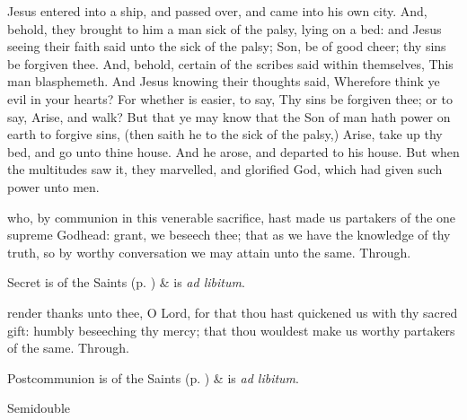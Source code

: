 
 Jesus entered into a ship, and passed over, and came into his own city. And, behold, they brought to him a man sick of the palsy, lying on a bed: and Jesus seeing their faith said unto the sick of the palsy; Son, be of good cheer; thy sins be forgiven thee. And, behold, certain of the scribes said within themselves, This man blasphemeth. And Jesus knowing their thoughts said, Wherefore think ye evil in your hearts? For whether is easier, to say, Thy sins be forgiven thee; or to say, Arise, and walk? But that ye may know that the Son of man hath power on earth to forgive sins, (then saith he to the sick of the palsy,) Arise, take up thy bed, and go unto thine house. And he arose, and departed to his house. But when the multitudes saw it, they marvelled, and glorified God, which had given such power unto men.


\secret
{} who, by communion in this venerable sacrifice, hast made us partakers of the one supreme Godhead: grant, we beseech thee; that as we have the knowledge of thy truth, so by worthy conversation we may attain unto the same. Through.
\begin{rubric}
     Secret is of the Saints (p. \pageref{SPSaints}) \&  is \emph{ad libitum}.
\end{rubric}


\postcommunion
{} render thanks unto thee, O Lord, for that thou hast quickened us with thy sacred gift: humbly beseeching thy mercy; that thou wouldest make us worthy partakers of the same. Through.
\begin{rubric}
     Postcommunion is of the Saints (p. \pageref{SPSaints}) \&  is \emph{ad libitum}.
\end{rubric}

\begin{inhead}
{Semidouble}
\end{inhead}
\par\noindent
{}


